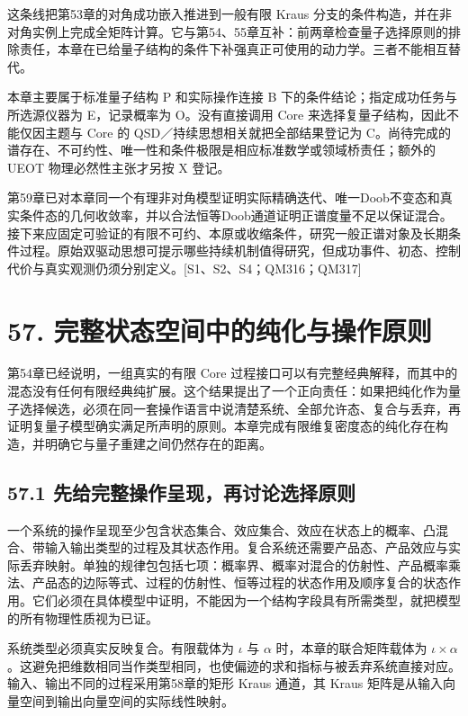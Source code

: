 \documentclass[
  11pt,
  oneside]{book}
\begin{document}
这条线把第53章的对角成功嵌入推进到一般有限 Kraus
分支的条件构造，并在非对角实例上完成全矩阵计算。它与第54、55章互补：前两章检查量子选择原则的排除责任，本章在已给量子结构的条件下补强真正可使用的动力学。三者不能相互替代。

本章主要属于标准量子结构 P 和实际操作连接 B
下的条件结论；指定成功任务与所选源仪器为 E，记录概率为 O。没有直接调用
Core 来选择复量子结构，因此不能仅因主题与 Core 的
QSD／持续思想相关就把全部结果登记为
C。尚待完成的谱存在、不可约性、唯一性和条件极限是相应标准数学或领域桥责任；额外的
UEOT 物理必然性主张才另按 X 登记。

第59章已对本章同一个有理非对角模型证明实际精确迭代、唯一Doob不变态和真实条件态的几何收敛率，并以合法恒等Doob通道证明正谱度量不足以保证混合。接下来应固定可验证的有限不可约、本原或收缩条件，研究一般正谱对象及长期条件过程。原始双驱动思想可提示哪些持续机制值得研究，但成功事件、初态、控制代价与真实观测仍须分别定义。{[}S1、S2、S4；QM316；QM317{]}

\hypertarget{ch-57}{%
\chapter{57. 完整状态空间中的纯化与操作原则}\label{ch-57}}

第54章已经说明，一组真实的有限 Core
过程接口可以有完整经典解释，而其中的混态没有任何有限经典纯扩展。这个结果提出了一个正向责任：如果把纯化作为量子选择候选，必须在同一套操作语言中说清楚系统、全部允许态、复合与丢弃，再证明复量子模型确实满足所声明的原则。本章完成有限维复密度态的纯化存在构造，并明确它与量子重建之间仍然存在的距离。

\hypertarget{ux5148ux7ed9ux5b8cux6574ux64cdux4f5cux5448ux73b0ux518dux8ba8ux8bbaux9009ux62e9ux539fux5219}{%
\section{57.1
先给完整操作呈现，再讨论选择原则}\label{ux5148ux7ed9ux5b8cux6574ux64cdux4f5cux5448ux73b0ux518dux8ba8ux8bbaux9009ux62e9ux539fux5219}}

一个系统的操作呈现至少包含状态集合、效应集合、效应在状态上的概率、凸混合、带输入输出类型的过程及其状态作用。复合系统还需要产品态、产品效应与实际丢弃映射。单独的规律包包括七项：概率界、概率对混合的仿射性、产品概率乘法、产品态的边际等式、过程的仿射性、恒等过程的状态作用及顺序复合的状态作用。它们必须在具体模型中证明，不能因为一个结构字段具有所需类型，就把模型的所有物理性质视为已证。

系统类型必须真实反映复合。有限载体为 \(\iota\) 与 \(\alpha\)
时，本章的联合矩阵载体为
\(\iota\times\alpha\)。这避免把维数相同当作类型相同，也使偏迹的求和指标与被丢弃系统直接对应。输入、输出不同的过程采用第58章的矩形
Kraus 通道，其 Kraus 矩阵是从输入向量空间到输出向量空间的实际线性映射。
\end{document}
